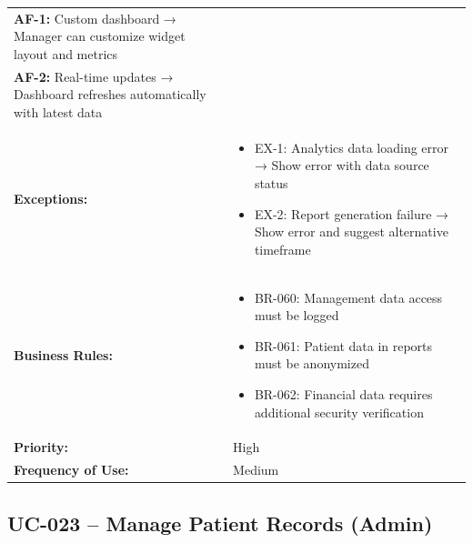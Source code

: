 \documentclass[12pt,a4paper]{article}
\begin{document}
\begin{longtable}{|p{4.5cm}|p{10.5cm}|}
\textbf{AF-1:} Custom dashboard → Manager can customize widget layout and metrics \\
\textbf{AF-2:} Real-time updates → Dashboard refreshes automatically with latest data \\
\hline
\textbf{Exceptions:} &
\begin{itemize}
  \item EX-1: Analytics data loading error → Show error with data source status
  \item EX-2: Report generation failure → Show error and suggest alternative timeframe
\end{itemize} \\
\hline
\textbf{Business Rules:} &
\begin{itemize}
  \item BR-060: Management data access must be logged
  \item BR-061: Patient data in reports must be anonymized
  \item BR-062: Financial data requires additional security verification
\end{itemize} \\
\hline
\textbf{Priority:} & High \\
\hline
\textbf{Frequency of Use:} & Medium \\
\hline
\end{longtable}

\subsection{UC-023 – Manage Patient Records (Admin)}
\end{document}
